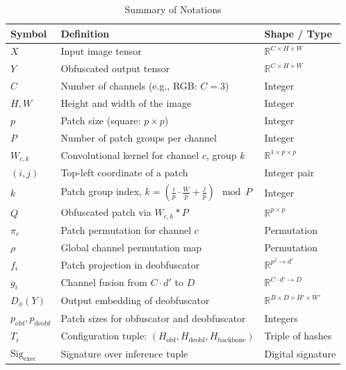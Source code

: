 \documentclass{ieeeaccess}
\begin{document}
\begin{table}[t]
\centering
\caption{Summary of Notations}
\label{tab:notation-summary}
\begin{tabular}{p{} p{} p{}}
\toprule
\textbf{Symbol} & \textbf{Definition} & \textbf{Shape / Type} \\
\midrule
$X$ & Input image tensor & $\mathbb{R}^{C \times H \times W}$ \\
$Y$ & Obfuscated output tensor & $\mathbb{R}^{C \times H \times W}$ \\
$C$ & Number of channels (e.g., RGB: $C=3$) & Integer \\
$H, W$ & Height and width of the image & Integer \\
$p$ & Patch size (square: $p \times p$) & Integer \\
$P$ & Number of patch groups per channel & Integer \\
$W_{c,k}$ & Convolutional kernel for channel $c$, group $k$ & $\mathbb{R}^{1 \times p \times p}$ \\
$(i, j)$ & Top-left coordinate of a patch & Integer pair \\
$k$ & Patch group index, $k = \left( \frac{i}{p} \cdot \frac{W}{p} + \frac{j}{p} \right) \mod P$ & Integer \\
$Q$ & Obfuscated patch via $W_{c,k} * P$ & $\mathbb{R}^{p \times p}$ \\
$\pi_c$ & Patch permutation for channel $c$ & Permutation \\
$\rho$ & Global channel permutation map & Permutation \\
$f_i$ & Patch projection in deobfuscator & $\mathbb{R}^{p^2 \to d'}$ \\
$g_i$ & Channel fusion from $C \cdot d'$ to $D$ & $\mathbb{R}^{C \cdot d' \to D}$ \\
$D_\phi(Y)$ & Output embedding of deobfuscator & $\mathbb{R}^{B \times D \times H' \times W'}$ \\
$p_{\text{obf}}, p_{\text{deobf}}$ & Patch sizes for obfuscator and deobfuscator & Integers \\
$T_i$ & Configuration tuple: $(H_{\text{obf}}, H_{\text{deobf}}, H_{\text{backbone}})$ & Triple of hashes \\
$\text{Sig}_{\text{exec}}$ & Signature over inference tuple & Digital signature \\
\bottomrule
\end{tabular}
\end{table}
\end{document}
